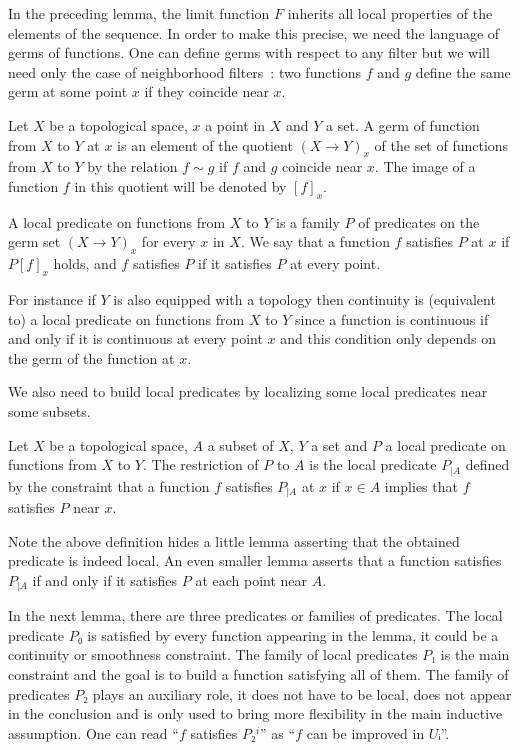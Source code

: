 \documentclass[10pt,a4paper]{article}
\newcommand{\lean}[1]{}
\newcommand{\leanok}{}
\begin{document}
In the preceding lemma, the limit function $F$ inherits all local properties of
the elements of the sequence. In order to make this precise, we need the
language of germs of functions. One can define germs with respect to any filter but
we will need only the case of neighborhood filters~: two functions $f$ and $g$
define the same germ at some point $x$ if they coincide near $x$.

\begin{definition}\label{def:germ}\lean{Filter.Germ}\leanok
  Let $X$ be a topological space, $x$ a point in $X$ and $Y$ a set. A germ of function
  from $X$ to $Y$ at $x$ is an element of the quotient $(X → Y)_x$ of the set of functions
  from $X$ to $Y$ by the relation $f ∼ g$ if $f$ and $g$ coincide near $x$. The image
  of a function $f$ in this quotient will be denoted by $[f]_x$.

  A local predicate on functions from $X$ to $Y$ is a family $P$ of predicates on the
  germ set $(X → Y)_x$ for every $x$ in $X$. We say that a function $f$
  satisfies $P$ at $x$ if $P [f]_x$ holds, and $f$ satisfies $P$ if it
  satisfies $P$ at every point.
\end{definition}

For instance if $Y$ is also equipped with a topology then continuity is
(equivalent to) a local predicate on functions from $X$ to $Y$ since a function
is continuous if and only if it is continuous at every point $x$ and this
condition only depends on the germ of the function at $x$.

We also need to build local predicates by localizing some local predicates near
some subsets.

\begin{definition}
  \label{def:restrict_germ_predicate}\lean{RestrictGermPredicate}\leanok
  Let $X$ be a topological space, $A$ a subset of $X$, $Y$ a set and $P$ a
  local predicate on functions from $X$ to $Y$. The restriction of $P$ to $A$
  is the local predicate $P_{|A}$ defined by the constraint that a function
  $f$ satisfies $P_{|A}$ at $x$ if $x ∈ A$ implies that $f$ satisfies $P$ near $x$.
\end{definition}

Note the above definition hides a little lemma asserting that the obtained
predicate is indeed local. An even smaller lemma asserts that a function satisfies
$P_{|A}$ if and only if it satisfies $P$ at each point near $A$.

In the next lemma, there are three predicates or families of predicates. The
local predicate $P₀$ is satisfied by every function appearing in the lemma, it
could be a continuity or smoothness constraint. The family of local predicates
$P₁$ is the main constraint and the goal is to build a function satisfying all
of them. The family of predicates $P₂$ plays an auxiliary role, it does not
have to be local, does not appear in the conclusion and is only used to bring more
flexibility in the main inductive assumption. One can read ``$f$ satisfies
$P₂^i$'' as ``$f$ can be improved in $Uᵢ$''.
\end{document}
